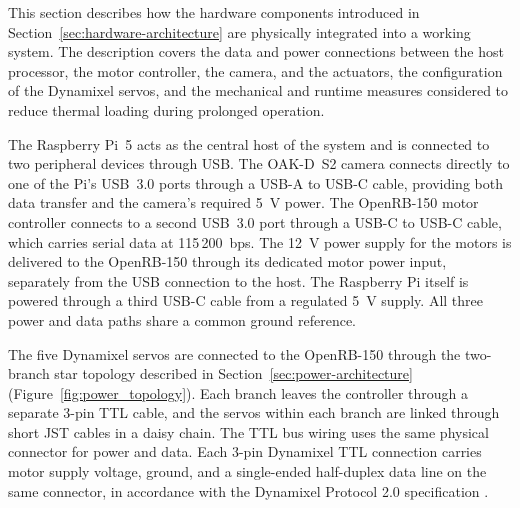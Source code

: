 \label{sec:hardware-integration}
This section describes how the hardware components introduced in 
Section~\ref{sec:hardware-architecture} are physically integrated into a working system. The 
description covers the data and power connections between the host 
processor, the motor controller, the camera, and the actuators, the 
configuration of the Dynamixel servos, and the mechanical and runtime 
measures considered to reduce thermal loading during prolonged 
operation.

The Raspberry Pi~5 acts as the central host of the system and is 
connected to two peripheral devices through USB. The OAK-D~S2 
camera connects directly to one of the Pi's USB~3.0 ports through 
a USB-A to USB-C cable, providing both data transfer and the 
camera's required 5~V power. The OpenRB-150 motor controller connects to a second USB~3.0 port 
through a USB-C to USB-C cable, which carries serial data at 
115\,200~bps. The 12~V power supply for the 
motors is delivered to the OpenRB-150 through its dedicated motor 
power input, separately from the USB connection to the host. The 
Raspberry Pi itself is powered through a third USB-C cable from a 
regulated 5~V supply. All three power and data paths share a 
common ground reference.

The five Dynamixel servos are connected to the OpenRB-150 through 
the two-branch star topology described in Section~\ref{sec:power-architecture} 
(Figure~\ref{fig:power_topology}). Each branch leaves the controller 
through a separate 3-pin TTL cable, and the servos within each 
branch are linked through short JST cables in a daisy chain. The 
TTL bus wiring uses the same physical connector for power and data. 
Each 3-pin Dynamixel TTL connection carries motor supply voltage, 
ground, and a single-ended half-duplex data line on the same connector, 
in accordance with the Dynamixel Protocol 2.0 specification 
\cite{robotis_dynamixel}.

